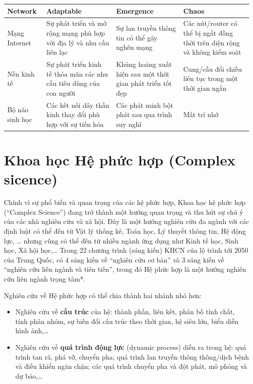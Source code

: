 \documentclass[]{book}
\begin{document}
\begin{tabu} to 
\hline
Network & Adaptable & Emergence & Chaos\\
\hline
Mạng Internet & Sự phát triển và mở rộng mạng phù hợp với địa lý và nhu cầu liên lạc & Sự lan truyền thông tin có thể gây nghẽn mạng & Các nút/router có thể bị ngắt đồng thời trên diện rộng và không kiểm soát\\
\hline
Nền kinh tế & Sự phát triển kinh tế thỏa mãn các nhu cầu tiêu dùng của con người & Khủng hoảng xuất hiện sau một thời gian phát triển tốt đẹp & Cung/cầu đổi chiều liên tục trong một thời gian ngắn\\
\hline
Bộ não sinh học & Các kết nối dây thần kinh thay đổi phù hợp với sự tiến hóa & Các phát minh bột phát sau qua trình suy nghĩ & Mất trí nhớ\\
\hline
\end{tabu}

\section{Khoa học Hệ phức hợp (Complex
sicence)}\label{khoa-hoc-h-phc-hp-complex-sicence}

Chính vì sự phổ biến và quan trọng của các hệ phức hợp, Khoa học hệ phức
hợp (``Complex Science'') đang trở thành một hướng quan trọng và thu hút
sự chú ý của các nhà nghiên cứu và xã hội. Đây là một hướng nghiên cứu
đa ngành với các định luật có thể đến từ Vật lý thống kê, Toán học, Lý
thuyết thông tin, Hệ động lực, \ldots{} nhưng cũng có thể đến từ nhiều
ngành ứng dụng như Kinh tế học, Sinh học, Xã hội học,\ldots{} Trong 22
chương trình (sáng kiến) KHCN của lộ trình tới 2050 của Trung Quốc, có 4
sáng kiến về ``nghiên cứu cơ bản'' và 3 sáng kiến về ``nghiên cứu liên
ngành và tiên tiến'', trong đó Hệ phức hợp là một hướng nghiên cứu liên
ngành trọng tâm*.

Nghiên cứu về Hệ phức hợp có thể chia thành hai nhánh nhỏ hơn:

\begin{itemize}
\item
  Nghiên cứu về \textbf{cấu trúc} của hệ: thành phần, liên kết, phân bố
  tính chất, tính phân nhóm, sự biến đổi cấu trúc theo thời gian, hệ
  siêu lớn, biểu diễn hình ảnh,\ldots{}
\item
  Nghiên cứu về \textbf{quá trình động lực} (dynamic process) diễn ra
  trong hệ: quá trình tan rã, phá vỡ, chuyển pha; quá trình lan truyền
  thông thông/dịch bệnh và điều khiển ngăn chặn; các quá trình chuyển
  pha và đột phát, mô phỏng và dự báo,\ldots{}
\end{itemize}
\end{document}
